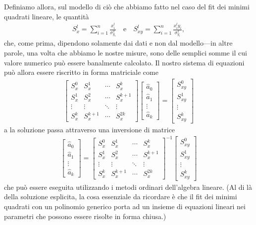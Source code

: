 Definiamo allora, sul modello di ciò che abbiamo fatto nel caso del fit dei
minimi quadrati lineare, le quantità
\begin{align*}
  S_x^l = \sum_{i = 1}^n \frac{x_i^l}{\sigma^2_{y_i}} \quad \text{e} \quad
  S_{xy}^l = \sum_{i = 1}^n \frac{x_i^l y_i}{\sigma^2_{y_i}},
\end{align*}
che, come prima, dipendono solamente dai dati e non dal modello---in altre
parole, una volta che abbiamo le nostre misure, sono delle semplici somme
il cui valore numerico può essere banalmente calcolato.
Il nostro sistema di equazioni può allora essere riscritto in forma matriciale
come
\begin{align}
  \begin{bmatrix}
    S_x^0 & S_x^1 & \cdots & S_x^k\\
    S_x^1 & S_x^2 & \cdots & S_x^{k+1}\\
    \vdots & \vdots & \ddots & \vdots\\
    S_x^k & S_x^{k+1} & \cdots & S_x^{2k}
  \end{bmatrix}
  \begin{bmatrix}
    \hat{a}_0\\
    \hat{a}_1\\
    \vdots\\
    \hat{a}_k
  \end{bmatrix} =
  \begin{bmatrix}
    S_{xy}^0\\
    S_{xy}^1\\
    \vdots\\
    S_{xy}^k
  \end{bmatrix}
\end{align}
a la soluzione passa attraverso una inversione di matrice
\begin{align}
  \begin{bmatrix}
    \hat{a}_0\\
    \hat{a}_1\\
    \vdots\\
    \hat{a}_k
  \end{bmatrix} =
  \begin{bmatrix}
    S_x^0 & S_x^1 & \cdots & S_x^k\\
    S_x^1 & S_x^2 & \cdots & S_x^{k+1}\\
    \vdots & \vdots & \ddots & \vdots\\
    S_x^k & S_x^{k+1} & \cdots & S_x^{2k}
  \end{bmatrix}^{-1}
  \begin{bmatrix}
    S_{xy}^0\\
    S_{xy}^1\\
    \vdots\\
    S_{xy}^k
  \end{bmatrix}
\end{align}
che può essere eseguita utilizzando i metodi ordinari dell'algebra lineare.
(Al di là della soluzione esplicita, la cosa essenziale da ricordare
è che il fit dei minimi quadrati con un polinomio generico porta ad
un insieme di equazioni lineari nei parametri che possono essere risolte
in forma chiusa.)


